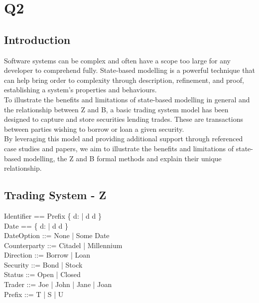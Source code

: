 \documentclass{article}
\begin{document}
\pagebreak
\section*{Q2}

\subsection*{Introduction}

Software systems can be complex and often have a scope too large for any developer to comprehend fully. State-based modelling is a powerful technique that can help bring order to complexity through description, refinement, and proof, establishing a system's properties and behaviours. \\
\newline
To illustrate the benefits and limitations of state-based modelling in general and the relationship between Z and B, a basic trading system model has been designed to capture and store securities lending trades. These are transactions between parties wishing to borrow or loan a given security. \\
\newline
By leveraging this model and providing additional support through referenced case studies and papers, we aim to illustrate the benefits and limitations of state-based modelling, the Z and B formal methods and explain their unique relationship.

\subsection*{Trading System - Z}

\begin{zed}
Identifier == Prefix \cross \{ d: \nat | d  \land d  \} \\ 
Date == \{ d: \nat | d  \land d  \} \\
DateOption ::= None | Some \ldata Date \rdata \\
Counterparty ::= Citadel | Millennium  \\ 
Direction ::= Borrow | Loan \\
Security ::= Bond | Stock \\
Status ::= Open | Closed \\  
Trader ::= Joe | John | Jane | Joan \\
Prefix ::= T | S | U \\
\end{zed}
  
\end{document}
